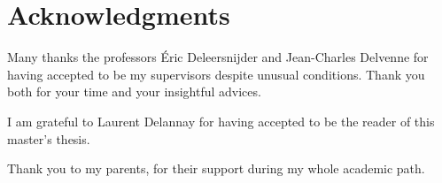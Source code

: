 \section*{Acknowledgments}
Many thanks the professors Éric Deleersnijder and Jean-Charles Delvenne for having accepted to be my supervisors despite unusual conditions. Thank you both for your time and your insightful advices.

\noindent I am grateful to Laurent Delannay for having accepted to be the reader of this master's thesis.

\noindent Thank you to my parents, for their support during my whole academic path.